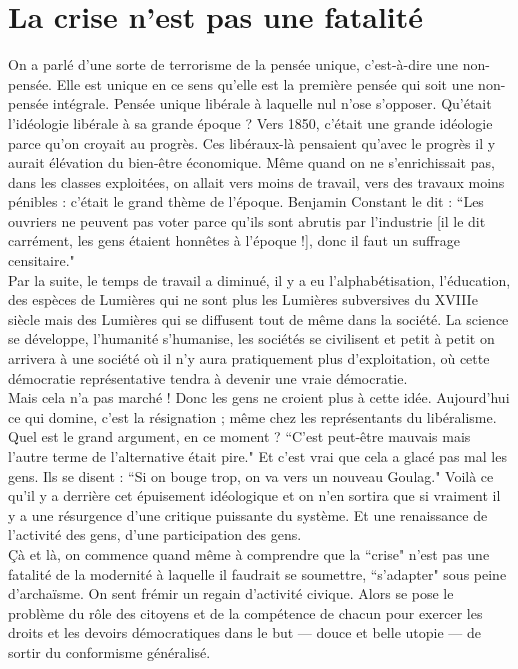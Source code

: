 \section*{La crise n'est pas une fatalité}

On a parlé d’une sorte de terrorisme de la pensée unique, c’est-à-dire une non-pensée. Elle est unique en ce sens qu’elle est la première pensée qui soit une non-pensée intégrale. Pensée unique libérale à laquelle nul n’ose s’opposer. Qu’était l’idéologie libérale à sa grande époque ? Vers 1850, c’était une grande idéologie parce qu’on croyait au progrès. Ces libéraux-là pensaient qu’avec le progrès il y aurait élévation du bien-être économique. Même quand on ne s’enrichissait pas, dans les classes exploitées, on allait vers moins de travail, vers des travaux moins pénibles : c’était le grand thème de l’époque. Benjamin Constant le dit : ``Les ouvriers ne peuvent pas voter parce qu’ils sont abrutis par l’industrie [il le dit carrément, les gens étaient honnêtes à l’époque !], donc il faut un suffrage censitaire."\\
Par la suite, le temps de travail a diminué, il y a eu l’alphabétisation, l’éducation, des espèces de Lumières qui ne sont plus les Lumières subversives du XVIIIe siècle mais des Lumières qui se diffusent tout de même dans la société. La science se développe, l’humanité s’humanise, les sociétés se civilisent et petit à petit on arrivera à une société où il n’y aura pratiquement plus d’exploitation, où cette démocratie représentative tendra à devenir une vraie démocratie.\\
Mais cela n’a pas marché ! Donc les gens ne croient plus à cette idée. Aujourd’hui ce qui domine, c’est la résignation ; même chez les représentants du libéralisme. Quel est le grand argument, en ce moment ? ``C’est peut-être mauvais mais l’autre terme de l’alternative était pire." Et c’est vrai que cela a glacé pas mal les gens. Ils se disent : ``Si on bouge trop, on va vers un nouveau Goulag." Voilà ce qu’il y a derrière cet épuisement idéologique et on n’en sortira que si vraiment il y a une résurgence d’une critique puissante du système. Et une renaissance de l’activité des gens, d’une participation des gens.\\
Çà et là, on commence quand même à comprendre que la ``crise" n’est pas une fatalité de la modernité à laquelle il faudrait se soumettre, ``s’adapter" sous peine d’archaïsme. On sent frémir un regain d’activité civique. Alors se pose le problème du rôle des citoyens et de la compétence de chacun pour exercer les droits et les devoirs démocratiques dans le but --- douce et belle utopie --- de sortir du conformisme généralisé.\\
